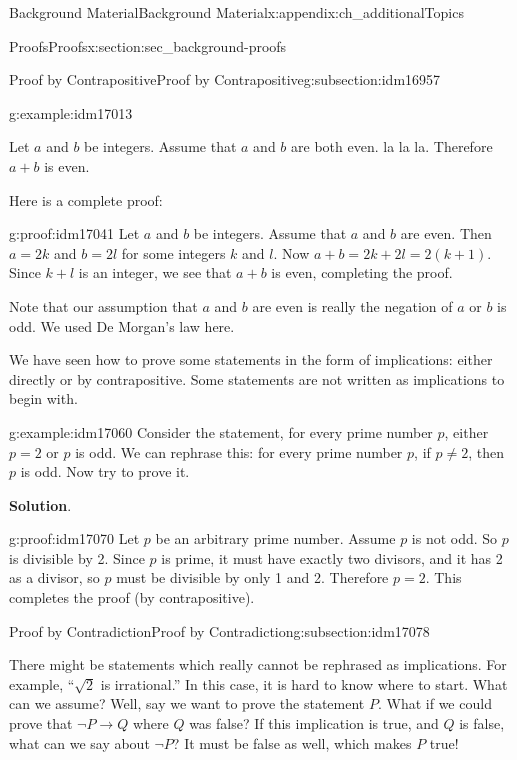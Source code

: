 \documentclass[oneside,10pt,]{book}
\numberwithin{equation}{chapter}
\def\imp{\rightarrow}
\begin{document}
\begin{appendixptx}{Background Material}{}{Background Material}{}{}{x:appendix:ch_additionalTopics}
\begin{sectionptx}{Proofs}{}{Proofs}{}{}{x:section:sec_background-proofs}
\begin{subsectionptx}{Proof by Contrapositive}{}{Proof by Contrapositive}{}{}{g:subsection:idm16957}
\begin{example}{}{g:example:idm17013}
\par
Let \(a\) and \(b\) be integers. Assume that \(a\) and \(b\) are both even. la la la. Therefore \(a+b\) is even.%
\par
Here is a complete proof:%
\begin{proofptx}{}{g:proof:idm17041}
Let \(a\) and \(b\) be integers. Assume that \(a\) and \(b\) are even. Then \(a = 2k\) and \(b = 2l\) for some integers \(k\) and \(l\). Now \(a + b = 2k + 2l = 2(k+1)\). Since \(k + l\) is an integer, we see that \(a + b\) is even, completing the proof.%
\end{proofptx}
Note that our assumption that \(a\) and \(b\) are even is really the negation of \(a\) or \(b\) is odd. We used De Morgan's law here.%
\end{example}
We have seen how to prove some statements in the form of implications: either directly or by contrapositive. Some statements are not written as implications to begin with.%
\begin{example}{}{g:example:idm17060}%
Consider the statement, for every prime number \(p\), either \(p = 2\) or \(p\) is odd. We can rephrase this: for every prime number \(p\), if \(p \ne 2\), then \(p\) is odd. Now try to prove it.%
\par\smallskip%
\noindent\textbf{Solution}.\hypertarget{g:solution:idm17069}{}\quad{}\begin{proofptx}{}{g:proof:idm17070}
Let \(p\) be an arbitrary prime number. Assume \(p\) is not odd. So \(p\) is divisible by 2. Since \(p\) is prime, it must have exactly two divisors, and it has 2 as a divisor, so \(p\) must be divisible by only 1 and 2. Therefore \(p = 2\). This completes the proof (by contrapositive).%
\end{proofptx}
\end{example}
\end{subsectionptx}
%
%
\typeout{************************************************}
\typeout{************************************************}
%
\begin{subsectionptx}{Proof by Contradiction}{}{Proof by Contradiction}{}{}{g:subsection:idm17078}
%
\par
There might be statements which really cannot be rephrased as implications. For example, ``\(\sqrt 2\) is irrational.'' In this case, it is hard to know where to start. What can we assume? Well, say we want to prove the statement \(P\). What if we could prove that \(\neg P \imp Q\) where \(Q\) was false? If this implication is true, and \(Q\) is false, what can we say about \(\neg P\)? It must be false as well, which makes \(P\) true!%

\end{subsectionptx}
\end{sectionptx}
\end{appendixptx}
\end{document}
